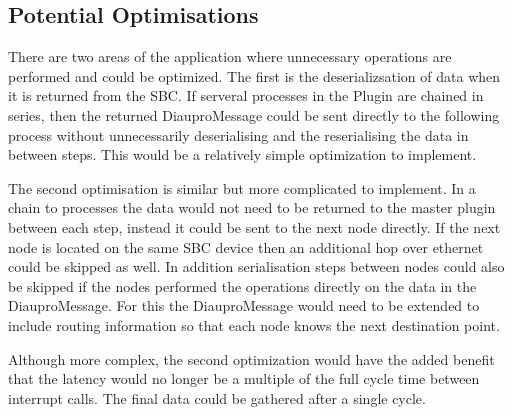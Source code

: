 \subsection{Potential Optimisations }

There are two areas of the application where unnecessary operations are performed and could be optimized. The first is the deserializsation of data when it is returned from the SBC. If serveral processes in the Plugin are chained in series, then the returned DiauproMessage could be sent directly to the following process without unnecessarily deserialising and the reserialising the data in between steps. This would be a relatively simple optimization to implement.

The second optimisation is similar but more complicated to implement. In a chain to processes the data would not need to be returned to the master plugin between each step, instead it could be sent to the next node directly. If the next node is located on the same SBC device then an additional hop over ethernet could be skipped as well. In addition serialisation steps between nodes could also be skipped if the nodes performed the operations directly on the data in the DiauproMessage. For this the DiauproMessage would need to be extended to include routing information so that each node knows the next destination point.

Although more complex, the second optimization would have the added benefit that the latency would no longer be a multiple of the full cycle time between interrupt calls. The final data could be gathered after a single cycle.


